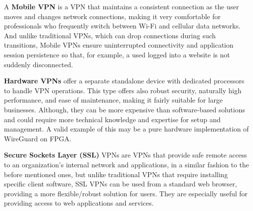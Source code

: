 \documentclass[12pt, fleqn, a4paper]{article}
\begin{document}
A \textbf{Mobile VPN}
is a VPN that maintains a consistent connection as the user moves and changes network connections, making it very comfortable for professionals who frequently switch between Wi-Fi and cellular data networks. And unlike traditional VPNs, which can drop connections during such transitions, Mobile VPNs ensure uninterrupted connectivity and application session persistence so that, for example, a used logged into a website is not suddenly disconnected. \citep{mobilevpn}

\textbf{Hardware VPNs}
offer a separate standalone device with dedicated processors to handle VPN operations. This type offers also robust security, naturally high performance, and ease of maintenance, making it fairly suitable for large businesses. Although, they can be more expensive than software-based solutions and could require more technical knowledge and expertise for setup and management. A valid example of this may be a pure hardware implementation of WireGuard on FPGA. \citep{hardwarevpn} 

\textbf{Secure Sockets Layer (SSL)}
VPNs are VPNs that provide safe remote access to an organization's internal network and applications, in a similar fashion to the before mentioned ones, but unlike traditional VPNs that require installing specific client software, SSL VPNs can be used from a standard web browser, providing a more flexible/robust solution for users. They are especially useful for providing access to web applications and services. \citep{sslvpn}
\end{document}
